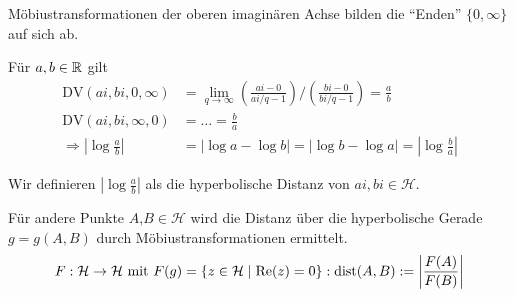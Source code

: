   \begin{bem}
    Möbiustransformationen der oberen imaginären Achse bilden die "`Enden"' $\lbrace 0,\infty \rbrace$ auf sich ab. \par
    Für $a,b \in \mathbb R$ gilt
    \begin{align*}
      \text{DV}(ai,bi,0,\infty) & = \lim_{q\to \infty} \left(\frac{ai-0}{ai/q-1}\right) \Big/ \left(\frac{bi-0}{bi/q-1}\right) = \frac{a}{b} \\
      \text{DV}(ai,bi,\infty,0) & = \ldots =\frac{b}{a} \\
      \Rightarrow \left\vert \log{\frac{a}{b}} \right\vert & = \lvert \log a - \log b \rvert = \lvert \log b - \log a \rvert = \left\vert \log{\frac{b}{a}} \right\vert
    \end{align*}
  \end{bem}

  \begin{defi}
    Wir definieren $\displaystyle{ \left\vert \log \frac{a}{b} \right \vert}$ als die hyperbolische Distanz von $ai, bi \in \mathcal{H}$.
  \end{defi}

  \begin{bem}
    Für andere Punkte $A$,$B \in \mathcal{H}$ wird die Distanz über die hyperbolische Gerade $g=g(A,B)$ durch Möbiustransformationen ermittelt.
    \begin{equation*}
      F:\mathcal{H} \to \mathcal{H} \text{ mit } F(g) = \lbrace z\in \mathcal{H} \mid \operatorname{Re}(z) = 0 \rbrace: \operatorname{dist}(A,B) := \left\vert \frac{F(A)}{F(B)} \right\vert
    \end{equation*}
  \end{bem}
